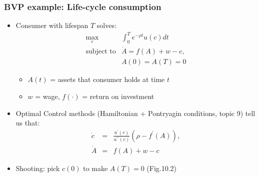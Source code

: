 \documentclass[bigger,handout]{beamer}
\begin{document}
\begin{frame}%
  
\frametitle{BVP example: Life-cycle consumption}

\begin{itemize}
\item Consumer with lifespan $T$ solves:%
\begin{equation*}
\begin{array}{rc}
\max_{c} & \int_{0}^{T}e^{-\rho t}u(c)dt \\ 
\text{subject to} & \dot{A}=f(A)+w-c, \\ 
& A(0)=A(T)=0%
\end{array}%
\end{equation*}

\begin{itemize}
\item $A(t)$ = assets that consumer holds at time $t$

\item $w$ = wage, $f\left( \cdot \right) $ = return on investment
\end{itemize}

\item Optimal Control methods (Hamiltonian + Pontryagin conditions, topic 9)
tell us that:%
\begin{eqnarray*}
\dot{c} &=&\frac{u^{\prime }(c)}{u^{\prime \prime }(c)}\left( \rho
-f^{\prime }(A)\right) , \\
\dot{A} &=&f(A)+w-c
\end{eqnarray*}

\item Shooting: pick $c\left( 0\right) $ to make $A\left( T\right) =0$
(Fig.10.2)
\end{itemize}

  
 
\end{frame}%

\begin{frame}

\end{frame}
  
\end{document}
